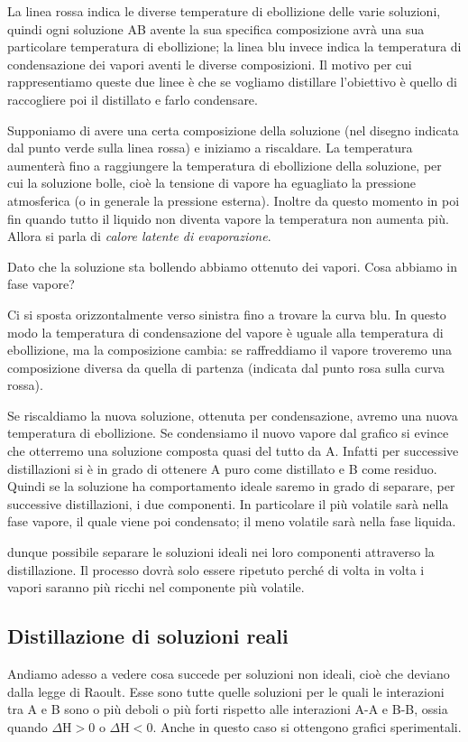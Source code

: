 La linea rossa indica le diverse temperature di ebollizione delle varie soluzioni, quindi ogni soluzione AB avente la sua specifica composizione avrà una sua particolare temperatura di ebollizione; la linea blu invece indica la temperatura di condensazione dei vapori aventi le diverse composizioni. Il motivo per cui rappresentiamo queste due linee è che se vogliamo distillare l'obiettivo è quello di raccogliere poi il distillato e farlo condensare.

Supponiamo di avere una certa composizione della soluzione (nel disegno indicata dal punto verde sulla linea rossa) e iniziamo a riscaldare. La temperatura aumenterà fino a raggiungere la temperatura di ebollizione della soluzione, per cui la soluzione bolle, cioè la tensione di vapore ha eguagliato la pressione atmosferica (o in generale la pressione esterna). Inoltre da questo momento in poi fin quando  tutto il liquido non diventa vapore la temperatura non aumenta più. Allora si parla di \textit{calore latente di evaporazione}.

Dato che la soluzione sta bollendo abbiamo ottenuto dei vapori. Cosa abbiamo in fase vapore?

Ci si sposta orizzontalmente verso sinistra fino a trovare la curva blu. In questo modo la temperatura di condensazione del vapore è uguale alla temperatura di ebollizione, ma la composizione cambia: se raffreddiamo il vapore troveremo una composizione diversa da quella di partenza (indicata dal punto rosa sulla curva rossa).

Se riscaldiamo la nuova soluzione, ottenuta per condensazione, avremo una nuova temperatura di ebollizione. Se condensiamo il nuovo vapore dal grafico si evince che otterremo una soluzione composta quasi del tutto da A. Infatti per successive distillazioni si è in grado di ottenere A puro come distillato e B come residuo. Quindi se la soluzione ha comportamento ideale saremo in grado di separare, per successive distillazioni, i due componenti. In particolare il più volatile sarà nella fase vapore, il quale viene poi condensato; il meno volatile sarà nella fase liquida.

\E dunque possibile separare le soluzioni ideali nei loro componenti attraverso la distillazione. Il processo dovrà solo essere ripetuto perché di volta in volta i vapori saranno più ricchi nel componente più volatile.
\subsection{Distillazione di soluzioni reali}
Andiamo adesso a vedere cosa succede per soluzioni non ideali, cioè che deviano dalla legge di Raoult. Esse sono tutte quelle soluzioni per le quali le interazioni tra A e B sono o più deboli o più forti rispetto alle interazioni A-A e B-B, ossia quando $\Delta$H$>$0 o $\Delta$H$<$0. Anche in questo caso si ottengono grafici sperimentali.


